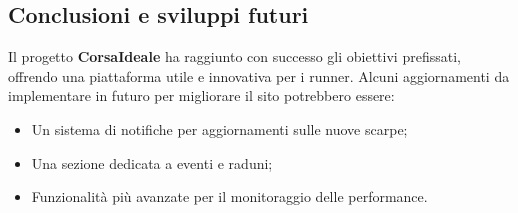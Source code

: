 \documentclass[a4paper, 12pt]{article}
\begin{document}
\begin{justify}
\section{Conclusioni e sviluppi futuri}
Il progetto \textbf{CorsaIdeale} ha raggiunto con successo gli obiettivi prefissati, offrendo una piattaforma utile e innovativa per i runner. Alcuni aggiornamenti da implementare in futuro per migliorare il sito potrebbero essere:
\begin{itemize}
    \item Un sistema di notifiche per aggiornamenti sulle nuove scarpe;
    \item Una sezione dedicata a eventi e raduni;
    \item Funzionalità più avanzate per il monitoraggio delle performance.
\end{itemize}


\vspace{1cm}

\end{justify}
\end{document}
